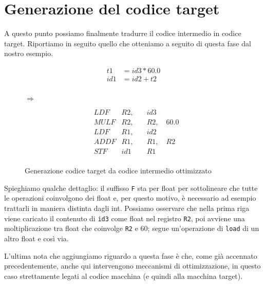 \documentclass[class=book, crop=false, oneside, 12pt]{standalone}
\begin{document}
\section{Generazione del codice target}
A questo punto possiamo finalmente tradurre il codice intermedio in codice target. Riportiamo in seguito quello che otteniamo a seguito di questa fase dal nostro esempio.
\begin{figure}[H]
    \centering
    \centering
    \begin{subfigure}{.3\textwidth}
        \centering
        \begin{equation*}
            \begin{aligned}
                t1  &= id3 * 60.0 \\
                id1 &= id2 + t2   \\
                                  \\
            \end{aligned}
        \end{equation*}
    \end{subfigure}%
    {\Huge$\Rightarrow$}%
    \begin{subfigure}{.45\textwidth}
        \centering
        \begin{align*}
            &LDF  &R2, \quad &id3 \quad      \\
            &MULF &R2, \quad &R2, \quad 60.0 \\
            &LDF  &R1, \quad &id2 \quad      \\
            &ADDF &R1, \quad &R1, \quad R2   \\
            &STF  &id1 \quad &R1  \quad      \\
        \end{align*}
    \end{subfigure}
    \caption{Generazione codice target da codice intermedio ottimizzato}
    \label{fig:final-example-target-code}
\end{figure}
Spieghiamo qualche dettaglio: il suffisso \texttt{F} sta per float per sottolineare che tutte le operazioni coinvolgono dei float e, per questo motivo, è necessario ad esempio trattarli in maniera distinta dagli int. Possiamo osservare che nella prima riga viene caricato il contenuto di \texttt{id3} come float nel registro \texttt{R2}, poi avviene una moltiplicazione tra float che coinvolge \texttt{R2} e \(60\); segue un'operazione di \texttt{load} di un altro float e così via.

L'ultima nota che aggiungiamo riguardo a questa fase è che, come già accennato precedentemente, anche qui intervengono meccanismi di ottimizzazione, in questo caso strettamente legati al codice macchina (e quindi alla macchina target).
\end{document}

